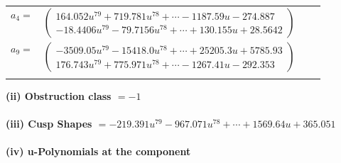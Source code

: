 \documentclass[1p]{elsarticle_modified}
\theoremstyle{definition}
\begin{document}
\begin{tabular}{m{7pt} m{180pt} m{7pt} m{180pt} }
\flushright $a_{4}=$&$\begin{pmatrix}164.052 u^{79}+719.781 u^{78}+\cdots-1187.59 u-274.887\\-18.4406 u^{79}-79.7156 u^{78}+\cdots+130.155 u+28.5642\end{pmatrix}$ \\
\flushright $a_{9}=$&$\begin{pmatrix}-3509.05 u^{79}-15418.0 u^{78}+\cdots+25205.3 u+5785.93\\176.743 u^{79}+775.971 u^{78}+\cdots-1267.41 u-292.353\end{pmatrix}$\\&\end{tabular}
\flushleft \textbf{(ii) Obstruction class $= -1$}\\~\\
\flushleft \textbf{(iii) Cusp Shapes $= -219.391 u^{79}-967.071 u^{78}+\cdots+1569.64 u+365.051$}\\~\\
\newpage\renewcommand{\arraystretch}{1}
\flushleft \textbf{(iv) u-Polynomials at the component}\newline \\
\end{document}
